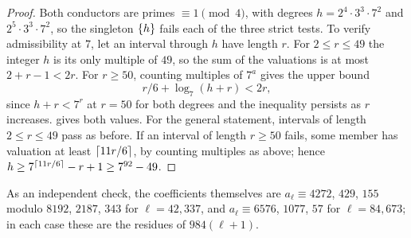\begin{proof}
Both conductors are primes $\equiv1\pmod4$, with degrees $h=2^4\cdot3^3\cdot7^2$ and
$2^5\cdot3^3\cdot7^2$, so the singleton $\{h\}$ fails each of the three strict tests. To
verify admissibility at $7$, let an interval through $h$ have length $r$. For $2\le r\le49$
the integer $h$ is its only multiple of $49$, so the sum of the valuations is at most
$2+r-1<2r$. For $r\ge50$, counting multiples of $7^a$ gives the upper bound
\[
 r/6+\log_7(h+r)<2r,
\]
since $h+r<7^r$ at $r=50$ for both degrees and the inequality persists as $r$ increases.
 gives both values. For the general statement, intervals of
length $2\le r\le49$ pass as before. If an interval of length $r\ge50$ fails, some member
has valuation at least $\lceil11r/6\rceil$, by counting multiples as above; hence
$h\ge7^{\lceil11r/6\rceil}-r+1\ge7^{92}-49$.
\end{proof}

As an independent check, the coefficients themselves are $a_\ell\equiv4272$, $429$, $155$
modulo $8192$, $2187$, $343$ for $\ell=42{,}337$, and $a_\ell\equiv6576$, $1077$, $57$ for
$\ell=84{,}673$; in each case these are the residues of $984(\ell+1)$.

